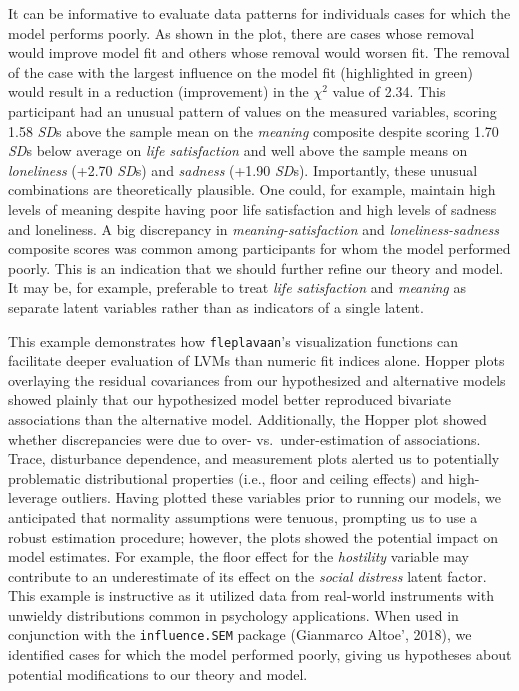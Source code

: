 \documentclass[
  english,
  doc]{apa6}
\begin{document}
It can be informative to evaluate data patterns for individuals cases for which the model performs poorly. As shown in the plot, there are cases whose removal would improve model fit and others whose removal would worsen fit. The removal of the case with the largest influence on the model fit (highlighted in green) would result in a reduction (improvement) in the \(\chi^2\) value of 2.34. This participant had an unusual pattern of values on the measured variables, scoring 1.58 \emph{SD}s above the sample mean on the \emph{meaning} composite despite scoring 1.70 \emph{SD}s below average on \emph{life satisfaction} and well above the sample means on \emph{loneliness} (+2.70 \emph{SD}s) and \emph{sadness} (+1.90 \emph{SD}s). Importantly, these unusual combinations are theoretically plausible. One could, for example, maintain high levels of meaning despite having poor life satisfaction and high levels of sadness and loneliness. A big discrepancy in \emph{meaning-satisfaction} and \emph{loneliness-sadness} composite scores was common among participants for whom the model performed poorly. This is an indication that we should further refine our theory and model. It may be, for example, preferable to treat \emph{life satisfaction} and \emph{meaning} as separate latent variables rather than as indicators of a single latent.

This example demonstrates how \texttt{fleplavaan}'s visualization functions can facilitate deeper evaluation of LVMs than numeric fit indices alone. Hopper plots overlaying the residual covariances from our hypothesized and alternative models showed plainly that our hypothesized model better reproduced bivariate associations than the alternative model. Additionally, the Hopper plot showed whether discrepancies were due to over- vs.~under-estimation of associations. Trace, disturbance dependence, and measurement plots alerted us to potentially problematic distributional properties (i.e., floor and ceiling effects) and high-leverage outliers. Having plotted these variables prior to running our models, we anticipated that normality assumptions were tenuous, prompting us to use a robust estimation procedure; however, the plots showed the potential impact on model estimates. For example, the floor effect for the \emph{hostility} variable may contribute to an underestimate of its effect on the \emph{social distress} latent factor. This example is instructive as it utilized data from real-world instruments with unwieldy distributions common in psychology applications. When used in conjunction with the \texttt{influence.SEM} package (Gianmarco Altoe', 2018), we identified cases for which the model performed poorly, giving us hypotheses about potential modifications to our theory and model.
\end{document}
